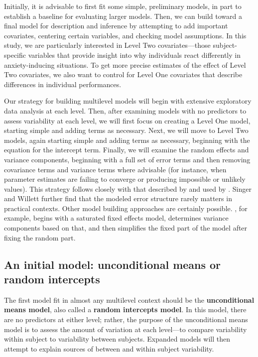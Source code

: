 \documentclass[
]{krantz}
\begin{document}
Initially, it is advisable to first fit some simple, preliminary models, in part to establish a baseline for evaluating larger models. Then, we can build toward a final model for description and inference by attempting to add important covariates, centering certain variables, and checking model assumptions. In this study, we are particularly interested in Level Two covariates---those subject-specific variables that provide insight into why individuals react differently in anxiety-inducing situations. To get more precise estimates of the effect of Level Two covariates, we also want to control for Level One covariates that describe differences in individual performances.

Our strategy for building multilevel models will begin with extensive exploratory data analysis at each level. Then, after examining models with no predictors to assess variability at each level, we will first focus on creating a Level One model, starting simple and adding terms as necessary. Next, we will move to Level Two models, again starting simple and adding terms as necessary, beginning with the equation for the intercept term. Finally, we will examine the random effects and variance components, beginning with a full set of error terms and then removing covariance terms and variance terms where advisable (for instance, when parameter estimates are failing to converge or producing impossible or unlikely values). This strategy follows closely with that described by \citet{Bryk2002} and used by \citet{Singer2003}. Singer and Willett further find that the modeled error structure rarely matters in practical contexts. Other model building approaches are certainly possible. \citet{Diggle2002}, for example, begins with a saturated fixed effects model, determines variance components based on that, and then simplifies the fixed part of the model after fixing the random part.

\hypertarget{modela8}{%
\subsection{An initial model: unconditional means or random intercepts}\label{modela8}}

The first model fit in almost any multilevel context should be the \textbf{unconditional means model},  also called a \textbf{random intercepts model}.  In this model, there are no predictors at either level; rather, the purpose of the unconditional means model is to assess the amount of variation at each level---to compare variability within subject to variability between subjects. Expanded models will then attempt to explain sources of between and within subject variability.
\end{document}
